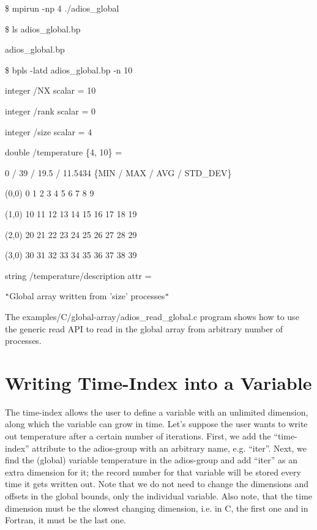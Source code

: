 \$ mpirun -np 4 ./adios\_global

\$ ls adios\_global.bp 

adios\_global.bp

\$  bpls -latd adios\_global.bp -n 10

integer    /NX                       scalar = 10

\parindent=3pt
integer    /rank                     scalar = 0

integer    /size                     scalar = 4

\parindent=7pt
double     /temperature              \{4, 10\} = 

\parindent=0pt
0 / 39 / 19.5 / 11.5434  \{MIN / MAX / AVG / STD\_DEV\}

\parindent=14pt
(0,0)    0 1 2 3 4 5 6 7 8 9

(1,0)    10 11 12 13 14 15 16 17 18 19

\parindent=28pt
(2,0)    20 21 22 23 24 25 26 27 28 29

\parindent=14pt
(3,0)    30 31 32 33 34 35 36 37 38 39

\parindent=7pt
string     /temperature/description  attr   = 

\parindent=0pt
\texttt{"}Global array written from 'size' processes\texttt{"}

The examples/C/global-array/adios\_read\_global.c program shows how to use the 
generic read API to read in the global array from arbitrary number of processes. 
\label{HToc84890303}\label{HToc212016678}\label{HToc212016920}\label{HToc182553450}

\section{Writing Time-Index into a Variable}

The time-index allows the user to define a variable with an unlimited dimension, 
along which the variable can grow in time. Let's suppose the user wants to write 
out temperature after a certain number of iterations. First, we add the ``time-index'' 
attribute to the adios-group with an arbitrary name, e.g. ``iter''. Next, we find 
the (global) variable temperature in the adios-group and add ``iter'' as an extra 
dimension for it; the record number for that variable will be stored every time 
it gets written out. Note that we do not need to change the dimensions and offsets 
in the global bounds, only the individual variable. Also note, that the time dimension 
must be the slowest changing dimension, i.e. in C, the first one and in Fortran, 
it must be the last one.

